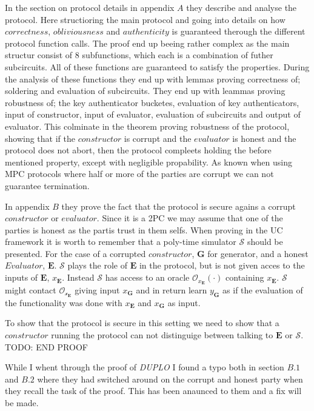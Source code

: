 \documentclass[twoside,11pt,openright]{report}
\newcommand{\todo}[1]{}
\renewcommand{\todo}[1]{{\color{red} TODO: {#1}} \\}
\newcommand{\DUPLO}{\textit{DUPLO} }
\begin{document}
In the section on protocol details in  appendix $A$ they describe and analyse the protocol. Here structioring the main protocol and going into details on how $correctness$, $obliviousness$ and $authenticity$ is guaranteed therough the different protocol function calls. The proof end up beeing rather complex as the main structur consist of $8$ subfunctions, which each is a combination of futher subcircuits. All of these functions are guaranteed to satisfy the properties. During the analysis of these functions they end up with lemmas proving correctness of; soldering and evaluation of subcircuits. They end up with leammas proving robustness of; the key authenticator bucketes, evaluation of key authenticators, input of constructor, input of evaluator, evaluation of subcircuits and output of evaluator. This colminate in the theorem proving robustness of the protocol, showing that if the $constructor$ is corrupt and the $evaluator$ is honest and the protocol does not abort, then the protocol compleets holding the before mentioned property, except with negligible propability. As known when using MPC protocols where half or more of the parties are corrupt we can not guarantee termination.

In appendix $B$ they prove the fact that the protocol is secure agains a corrupt $constructor$ or $evaluator$. Since it is a 2PC we may assume that one of the parties is honest as the partis trust in them selfs. When proving in the UC framework it is worth to remember that a poly-time simulator $\mathcal{S}$ should be presented. For the case of a corrupted $constructor$, $\mathbf{G}$ for generator, and a honest $Evaluator$, $\mathbf{E}$. $\mathcal{S}$ plays the role of $\mathbf{E}$ in the protocol, but is not given acces to the inputs of $\mathbf{E}$, $x_{\mathbf{E}}$. Instead $\mathcal{S}$ has access to an oracle $\mathcal{O}_{x_{\mathbf{E}}}(\cdot)$ containing $x_{\mathbf{E}}$. $\mathcal{S}$ might contact $\mathcal{O_{x_{\mathbf{E}}}}$ giving input $x_{\mathbf{G}}$ and in return learn $y_{\mathbf{G}}$ as if the evaluation of the functionality was done with $x_{\mathbf{E}}$ and $x_{\mathbf{G}}$ as input.

To show that the protocol is secure in this setting we need to show that a $constructor$ running the protocol can not distinguige between talking to $\mathbf{E}$ or $\mathcal{S}$. \todo{END PROOF}

\bigskip

While I whent through the proof of \DUPLO I found a typo both in section $B.1$ and $B.2$ where they had switched around on the corrupt and honest party when they recall the task of the proof.  This has been anaunced to them and a fix will be made.
\end{document}
